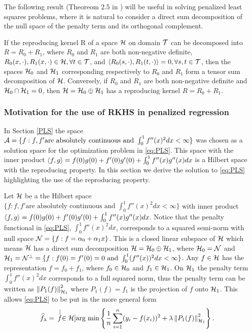 The following result (Theoreom 2.5 in \cite{Gu2002}) will be useful in solving penalized least squares problems, where it is natural to consider a direct sum decomposition of the null space of the penalty term and its orthogonal complement. 
\begin{thm} \label{RKHS_decomposition}
If the reproducing kernel R of a space $\mathcal{H}$ on domain $\mathcal{T}$ can be decomposed into $R= R_0 + R_1$, where $R_0$ and $R_1$ are both non-negative definite, $R_0(x,\cdot), R_1(x,\cdot) \in \mathcal{H}, \forall t \in \mathcal{T}$, and $\langle R_0(s,\cdot), R_1(t, \cdot) \rangle =0, \forall s,t \in \mathcal{T}$, then the spaces $\mathcal{H}_0$ and $\mathcal{H}_1$ corresponding respectively to $R_0$ and $R_1$ form a tensor sum decomposition of $\mathcal{H}$. Conversely, if $R_0$ and $R_1$ are both non-negative definite and $\mathcal{H}_0 \cap \mathcal{H}_1 = {0}$, then $\mathcal{H} = \mathcal{H}_0 \oplus \mathcal{H}_1$ has a reproducing kernel $R = R_0 + R_1$. 
\end{thm}



\subsubsection{Motivation for the use of RKHS in penalized regression} \label{motivation for RKHS}

In Section \ref{PLS} the space $\mathcal{A} = \{f: f, f' \mbox{are absolutely continuous and } \int_0^1f''(x)^2dx <\infty\}$ was chosen as a solution space for the optimization problem in \eqref{eq:PLS}. This space with the inner product $\langle f, g \rangle = f(0)g(0) + f'(0)g'(0) + \int_0^1 f''(x)g''(x)dx$ is a Hilbert space with the reproducing property. In this section we derive the solution to \eqref{eq:PLS} highlighting the use of the reproducing property.  

Let $\mathcal{H}$ be a the Hilbert space $\{f: f, f' \mbox{are absolutely continuous and } \int_0^1f''(x)^2dx <\infty\}$ with inner product $\langle f, g \rangle = f(0)g(0) + f'(0)g'(0) + \int_0^1 f''(x)g''(x)dx$. Notice that the penalty functional in \eqref{eq:PLS}, $\int_0^1f''(x)^2dx$, corresponds to a squared semi-norm with null space $\mathcal{N} = \{f: f=\alpha_0 + \alpha_1x\}$. This is a closed linear subspace of $\mathcal{H}$ which means $\mathcal{H}$ has a direct sum decomposition $\mathcal{H} = \mathcal{H}_0 \oplus \mathcal{H}_1$, where $\mathcal{H}_0 = \mathcal{N}$ and $\mathcal{H}_1 = \mathcal{N}^{\bot}= \{f: f(0)=f'(0)=0 \mbox{ and } \int_0^1(f''(x))^2dx < \infty\}$. Any $f \in \mathcal{H}$ has the representation $f = f_0 + f_1$, where $f_0 \in \mathcal{H}_0$ and $f_1 \in \mathcal{H}_1$. On $\mathcal{H}_1$ the penalty term $\int_0^1f''(x)^2dx$ corresponds to a full squared norm, thus the penalty term can be written as $\left\|P_1(f)\right\|_{\mathcal{H}_1}^2$ where $P_1(f) = f_1$ is the projection of $f$ onto $\mathcal{H}_1$. This allows \eqref{eq:PLS} to be put in the more general form
\begin{equation*}
\widehat{f}_{\lambda} = \hspace{.07in}\stackrel[f \in \mathcal{H}]{}{\mbox{arg min}} \left\{ \frac{1}{n}\sum_{i=1}^{n}(y_i - f(x_i))^2 + \lambda\left\|P_1(f)\right\|^2_{\mathcal{H}_1} \right\}.
\label{eq:PLS_norm}
\end{equation*}

